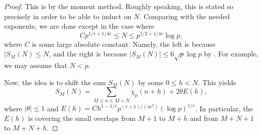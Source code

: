 \documentclass[../notes.tex]{subfiles}
\begin{document}
\begin{proof}
	This is by the moment method. Roughly speaking, this is stated so precisely in order to be able to induct on $N$. Comparing with the needed exponents, we are done except in the case where
	\[Cp^{1/r+1/4r}\le N\le p^{1/2+1/4r}\log p,\]
	where $C$ is some large absolute constant. Namely, the left is because $|S_M(N)\le N$, and the right is because $|S_M(N)|\le6\sqrt p\log p$ by . For example, we may assume that $N<p$.

	Now, the idea is to shift the sum $S_M(N)$ by some $0\le h<N$. This yields
	\[S_M(N)=\sum_{M\le n\le M+N}\chi_p(n+h)+2\theta E(h),\]
	where $|\theta|\le1$ and $E(h)=Ch^{1-1/r}p^{(r+1)/\left(4r^2\right)}(\log p)^{1/r}$. In particular, the $E(h)$ is covering the small overlaps from $M+1$ to $M+h$ and from $M+N+1$ to $M+N+h$.


\end{proof}
\end{document}

